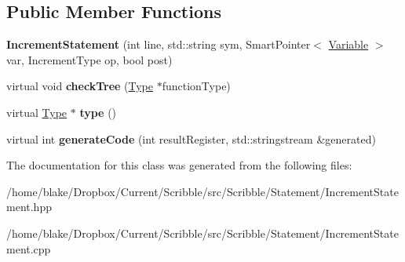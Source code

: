 \subsection*{Public Member Functions}
\begin{DoxyCompactItemize}
\item 
\hypertarget{class_scribble_core_1_1_increment_statement_aad8c51d7b0491659f6bbce01cf319e94}{{\bfseries Increment\-Statement} (int line, std\-::string sym, Smart\-Pointer$<$ \hyperlink{class_scribble_core_1_1_variable}{Variable} $>$ var, Increment\-Type op, bool post)}\label{class_scribble_core_1_1_increment_statement_aad8c51d7b0491659f6bbce01cf319e94}

\item 
\hypertarget{class_scribble_core_1_1_increment_statement_adbdd48535f60f2b10ecda7988995bca0}{virtual void {\bfseries check\-Tree} (\hyperlink{class_scribble_core_1_1_type}{Type} $\ast$function\-Type)}\label{class_scribble_core_1_1_increment_statement_adbdd48535f60f2b10ecda7988995bca0}

\item 
\hypertarget{class_scribble_core_1_1_increment_statement_a61a016b7be20f61dd62f3ce9d14ac2a3}{virtual \hyperlink{class_scribble_core_1_1_type}{Type} $\ast$ {\bfseries type} ()}\label{class_scribble_core_1_1_increment_statement_a61a016b7be20f61dd62f3ce9d14ac2a3}

\item 
\hypertarget{class_scribble_core_1_1_increment_statement_a62aa6d2006e1f4e4cc4449be58ebbdea}{virtual int {\bfseries generate\-Code} (int result\-Register, std\-::stringstream \&generated)}\label{class_scribble_core_1_1_increment_statement_a62aa6d2006e1f4e4cc4449be58ebbdea}

\end{DoxyCompactItemize}


The documentation for this class was generated from the following files\-:\begin{DoxyCompactItemize}
\item 
/home/blake/\-Dropbox/\-Current/\-Scribble/src/\-Scribble/\-Statement/Increment\-Statement.\-hpp\item 
/home/blake/\-Dropbox/\-Current/\-Scribble/src/\-Scribble/\-Statement/Increment\-Statement.\-cpp\end{DoxyCompactItemize}

